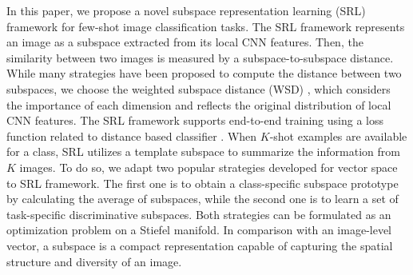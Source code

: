 In this paper, we propose a novel subspace representation learning (SRL) framework for few-shot image classification tasks.
The SRL framework represents an image as a subspace extracted from its local CNN features.
Then, the similarity between two images is measured by a subspace-to-subspace distance.
While many strategies \cite{zuccon2009semantic} have been proposed to compute the distance between two subspaces, we choose the weighted subspace distance (WSD) \cite{li2009weighted}, which considers the importance of each dimension and reflects the original distribution of local CNN features. 
The SRL framework supports end-to-end training using a loss function related to distance based classifier \cite{chen2019closer}.
When $K$-shot examples are available for a class, SRL utilizes a template subspace to summarize the information from $K$ images.
To do so, we adapt two popular strategies developed for vector space to SRL framework.
The first one is to obtain a class-specific subspace prototype by calculating the average of subspaces, while the second one is to learn a set of task-specific discriminative subspaces.
Both strategies can be formulated as an optimization problem on a Stiefel manifold.
In comparison with an image-level vector, a subspace is a compact representation capable of capturing the spatial structure and diversity of an image.



